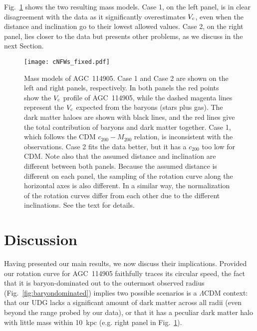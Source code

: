 \documentclass[fleqn,usenatbib]{mnras}
\begin{document}
Fig.~\ref{fig:massmodels} shows the two resulting mass models. Case 1, on the left panel, is in clear disagreement with the data as it significantly overestimates $V_{\rm c}$, even when the distance and inclination go to their lowest allowed values. Case 2, on the right panel, lies closer to the data but presents other problems, as we discuss in the next Section. 




\begin{figure*}
    \centering
    \texttt{[image: cNFWs\_fixed.pdf]}
    \caption{Mass models of AGC~114905. Case 1 and Case 2 are shown on the left and right panels, respectively. In both panels the red points show the $V_{\rm c}$ profile of AGC~114905, while the dashed magenta lines represent the $V_{\rm c}$ expected from the baryons (stars plus gas). The dark matter haloes are shown with black lines, and the red lines give the total contribution of baryons and dark matter together. Case 1, which follows the CDM $c_{200}-M_{200}$ relation, is inconsistent with the observations. Case 2 fits the data better, but it has a $c_{200}$ too low for CDM. Note also that the assumed distance and inclination are different between both panels. Because the assumed distance is different on each panel, the sampling of the rotation curve along the horizontal axes is also different. In a similar way, the normalization of the rotation curves differ from each other due to the different inclinations. See the text for details.}
    \label{fig:massmodels}
\end{figure*}



\section{Discussion}
\label{sec:discussion}

Having presented our main results, we now discuss their implications. Provided our rotation curve for AGC~114905 faithfully traces its circular speed, the fact that it is baryon-dominated out to the outermost observed radius (Fig.~\ref{fig:baryondominated}) implies two possible scenarios is a $\Lambda$CDM context: that our UDG lacks a significant amount of dark matter across all radii (even beyond the range probed by our data), or that it has a peculiar dark matter halo with little mass within 10~kpc (e.g. right panel in Fig.~\ref{fig:massmodels}).
\end{document}
